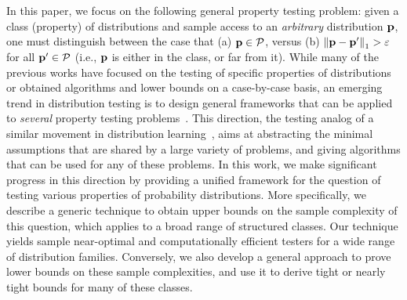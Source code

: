 In this paper, we focus on the following general property testing problem: given a class (property) of distributions \property and sample access to an \emph{arbitrary} distribution $\mathbf{p}$, one must distinguish between the case that \textsf{(a)} $\mathbf{p}\in\mathcal{P}$, versus \textsf{(b)} ${\lVert\mathbf{p}-\mathbf{p}^\prime{\rVert}}_1 >\varepsilon$ for all $\mathbf{p}^\prime\in\mathcal{P}$ (i.e., $\mathbf{p}$ is either in the class, or far from it). While many of the previous works have focused on the testing of specific properties of distributions or obtained algorithms and lower bounds on a case-by-case basis, an emerging trend in distribution testing is to design general frameworks that can be applied to \emph{several} property testing problems~\cite{Valiant:11,VV:11:stoc, DKN:15, DKN:15:FOCS}. This direction, the testing analog of a similar movement in distribution learning~\cite{CDSS:13,CDSS:14:NIPS,CDSS:14,ADLS:15}, aims at abstracting the minimal assumptions that are shared by a large variety of problems, and giving algorithms that can be used for any of these problems. In this work, we make significant progress in this direction by providing a unified framework for the question of testing various properties of probability distributions. More specifically, we describe a generic technique to obtain upper bounds on the sample complexity of this question, which applies to a broad range of structured classes. Our technique yields sample near-optimal and computationally efficient testers for a wide range of distribution families. Conversely, we also develop a general approach to prove lower bounds on these sample complexities, and use it to derive tight or nearly tight bounds for many of these classes.

